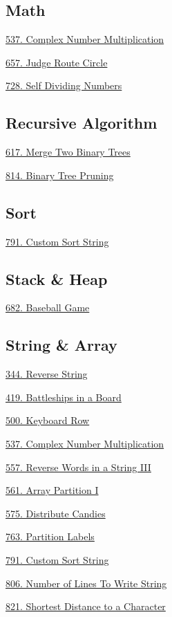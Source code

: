 \subsection*{Math}
\begin{flushleft}
    \hyperref[algo:537]{537. Complex Number Multiplication}

    \hyperref[algo:657]{657. Judge Route Circle}
    
    \hyperref[algo:728]{728. Self Dividing Numbers}
\end{flushleft}

\subsection*{Recursive Algorithm}
\begin{flushleft}
    \hyperref[algo:617]{617. Merge Two Binary Trees}

    \hyperref[algo:814]{814. Binary Tree Pruning}
\end{flushleft}

\subsection*{Sort}
\begin{flushleft}
    \hyperref[algo:791]{791. Custom Sort String}
\end{flushleft}

\subsection*{Stack \& Heap}
\begin{flushleft}
    \hyperref[algo:682]{682. Baseball Game}
\end{flushleft}

\subsection*{String \& Array}
\begin{flushleft}
    \hyperref[algo:344]{344. Reverse String}

    \hyperref[algo:419]{419. Battleships in a Board}

    \hyperref[algo:500]{500. Keyboard Row}

    \hyperref[algo:537]{537. Complex Number Multiplication}

    \hyperref[algo:557]{557. Reverse Words in a String III}

    \hyperref[algo:561]{561. Array Partition I}

    \hyperref[algo:575]{575. Distribute Candies}
    
    \hyperref[algo:763]{763. Partition Labels}
    
    \hyperref[algo:791]{791. Custom Sort String}
    
    \hyperref[algo:806]{806. Number of Lines To Write String}
    
    \hyperref[algo:821]{821. Shortest Distance to a Character}
\end{flushleft}

